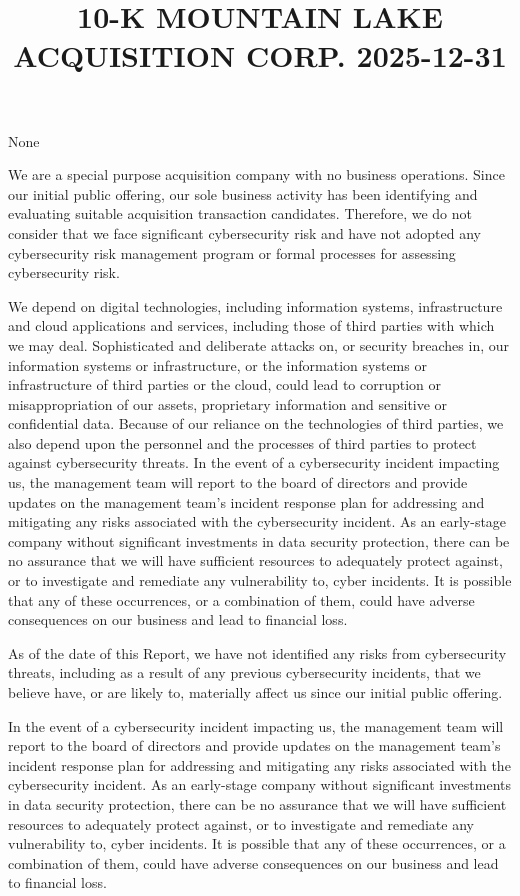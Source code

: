 \documentclass[11pt,a4paper]{article}
\title{10-K MOUNTAIN LAKE ACQUISITION CORP. 2025-12-31}
\begin{document}
\maketitle

None

We are a special purpose acquisition company with no business operations. Since our initial public offering, our sole business activity has been identifying and evaluating suitable acquisition transaction candidates. Therefore, we do not consider that we face significant cybersecurity risk and have not adopted any cybersecurity risk management program or formal processes for assessing cybersecurity risk.

We depend on digital technologies, including information systems, infrastructure and cloud applications and services, including those of third parties with which we may deal. Sophisticated and deliberate attacks on, or security breaches in, our information systems or infrastructure, or the information systems or infrastructure of third parties or the cloud, could lead to corruption or misappropriation of our assets, proprietary information and sensitive or confidential data. Because of our reliance on the technologies of third parties, we also depend upon the personnel and the processes of third parties to protect against cybersecurity threats. In the event of a cybersecurity incident impacting us, the management team will report to the board of directors and provide updates on the management team's incident response plan for addressing and mitigating any risks associated with the cybersecurity incident. As an early-stage company without significant investments in data security protection, there can be no assurance that we will have sufficient resources to adequately protect against, or to investigate and remediate any vulnerability to, cyber incidents. It is possible that any of these occurrences, or a combination of them, could have adverse consequences on our business and lead to financial loss.

As of the date of this Report, we have not identified any risks from cybersecurity threats, including as a result of any previous cybersecurity incidents, that we believe have, or are likely to, materially affect us since our initial public offering.

In the event of a cybersecurity incident impacting us, the management team will report to the board of directors and provide updates on the management team's incident response plan for addressing and mitigating any risks associated with the cybersecurity incident. As an early-stage company without significant investments in data security protection, there can be no assurance that we will have sufficient resources to adequately protect against, or to investigate and remediate any vulnerability to, cyber incidents. It is possible that any of these occurrences, or a combination of them, could have adverse consequences on our business and lead to financial loss.
\end{document}
